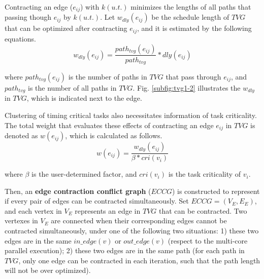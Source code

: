 \documentclass[conference]{IEEEtran}
\begin{document}
Contracting an edge ($e_{ij}$) with $k(u.t.)$ minimizes the lengths of all paths that passing though $e_{ij}$ by $k(u.t.)$. Let $w_{dly}(e_{ij})$ be the schedule length of $TVG$ that can be optimized after contracting $e_{ij}$, and it is estimated by the following equations.
\begin{equation}
w_{dly}(e_{ij})=\frac{path_{tvg}(e_{ij})}{path_{tvg}}*dly(e_{ij})
\end{equation}


\noindent where $path_{tvg}(e_{ij})$ is the number of paths in $TVG$ that pass through $e_{ij}$, and $path_{tvg}$ is the number of all paths in $TVG$. Fig. \ref{subfig:tvg1-2} illustrates the $w_{dly}$ in $TVG$, which is indicated next to the edge.


Clustering of timing critical tasks also necessitates information of task criticality. The total weight that evaluates these effects of contracting an edge $e_{ij}$ in $TVG$ is denoted as $w(e_{ij})$, which is calculated as follows.
\begin{equation}
w(e_{ij}) = \frac{w_{dly}(e_{ij})}{\beta*cri(v_i)}
\label{equ:weight_e}
\end{equation}

\noindent where $\beta$ is the user-determined factor, and $cri(v_i)$ is the task criticality of $v_i$.


Then, an \textbf{edge contraction conflict graph} ($ECCG$) is constructed to represent if every pair of edges can be contracted simultaneously. Set $ECCG=(V_E,E_E)$, and each vertex in $V_E$ represents an edge in $TVG$ that can be contracted. Two vertexes in $V_E$ are connected when their corresponding edges cannot be contracted simultaneously, under one of the following two situations: 1) these two edges are in the same $in\_edge(v)$ or $out\_edge(v)$ (respect to the multi-core parallel execution); 2) these two edges are in the same path (for each path in $TVG$, only one edge can be contracted in each iteration, such that the path length will not be over optimized).
\end{document}
